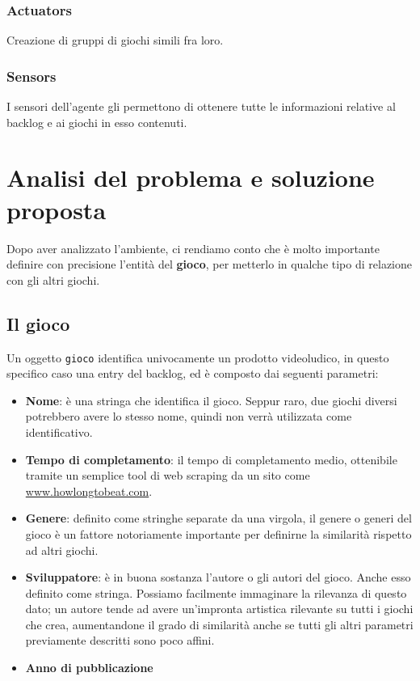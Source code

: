     \subsubsection{Actuators}
        Creazione di gruppi di giochi simili fra loro.
        
    \subsubsection{Sensors}
        I sensori dell'agente gli permettono di ottenere tutte le informazioni relative al backlog e ai giochi in esso contenuti.
        
\section{Analisi del problema e soluzione proposta}
    Dopo aver analizzato l'ambiente, ci rendiamo conto che è molto importante definire con precisione l'entità del \textbf{gioco}, per metterlo in qualche tipo di relazione con gli altri giochi.
    
    \subsection{Il gioco}
        Un oggetto \texttt{gioco} identifica univocamente un prodotto videoludico, in questo specifico caso una entry del backlog, ed è composto dai seguenti parametri:
        \begin{itemize}
            \item \textbf{Nome}: è una stringa che identifica il gioco. Seppur raro, due giochi diversi potrebbero avere lo stesso nome, quindi non verrà utilizzata come identificativo.
            
            \item \textbf{Tempo di completamento}: il tempo di completamento medio, ottenibile tramite un semplice tool di web scraping da un sito come \url{www.howlongtobeat.com}.
          
            \item \textbf{Genere}: definito come stringhe separate da una virgola, il genere o generi del gioco è un fattore notoriamente importante per definirne la similarità rispetto ad altri giochi.
           
            \item \textbf{Sviluppatore}: è in buona sostanza l'autore o gli autori del gioco. Anche esso definito come stringa. Possiamo facilmente immaginare la rilevanza di questo dato; un autore tende ad avere un'impronta artistica rilevante su tutti i giochi che crea, aumentandone il grado di similarità anche se tutti gli altri parametri previamente descritti sono poco affini.
            
            \item \textbf{Anno di pubblicazione}
        \end{itemize}
        
